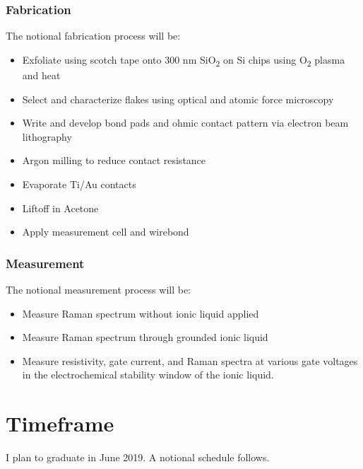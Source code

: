\documentclass[11pt]{article}
\begin{document}
\begin{multicols}{2}
\subsubsection{Fabrication}

The notional fabrication process will be:

\begin{itemize}
	\item Exfoliate \rucl using scotch tape onto 300 nm SiO\textsubscript{2} on Si chips using O\textsubscript{2} plasma and heat
	\item Select and characterize flakes using optical and atomic force microscopy
	\item Write and develop bond pads and ohmic contact pattern via electron beam lithography
	\item Argon milling to reduce contact resistance
	\item Evaporate Ti/Au contacts
	\item Liftoff in Acetone
	\item Apply measurement cell and wirebond
\end{itemize}

\subsubsection{Measurement}

The notional measurement process will be:

\begin{itemize}
	\item Measure Raman spectrum without ionic liquid applied
	\item Measure Raman spectrum through grounded ionic liquid
	\item Measure  resistivity, gate current, and Raman spectra at various gate voltages in the electrochemical stability window of the ionic liquid. 
\end{itemize}

\section{Timeframe}
I plan to graduate in June 2019. A notional schedule follows.


\end{multicols}
\end{document}
